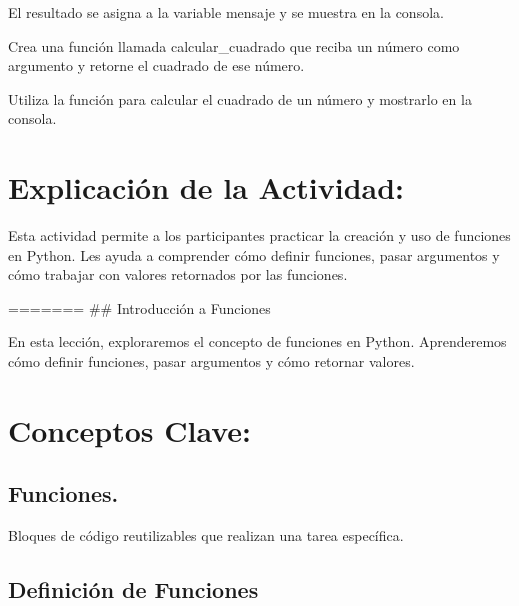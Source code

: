 \documentclass[
  a4paper,
  DIV=11,
  numbers=noendperiod,
  onepage,
  openany]{scrreprt}
\begin{document}
El resultado se asigna a la variable mensaje y se muestra en la consola.

\begin{tcolorbox}[enhanced jigsaw, colbacktitle=quarto-callout-important-color!10!white, toprule=.15mm, leftrule=.75mm, titlerule=0mm, opacityback=0, rightrule=.15mm, opacitybacktitle=0.6, breakable, left=2mm, coltitle=black, title=\textcolor{quarto-callout-important-color}{\faExclamation}\hspace{0.5em}{Actividad Práctica:}, toptitle=1mm, bottomtitle=1mm, arc=.35mm, bottomrule=.15mm, colback=white, colframe=quarto-callout-important-color-frame]

Crea una función llamada calcular\_cuadrado que reciba un número como
argumento y retorne el cuadrado de ese número.

Utiliza la función para calcular el cuadrado de un número y mostrarlo en
la consola.

\end{tcolorbox}

\hypertarget{explicaciuxf3n-de-la-actividad-42}{%
\section{Explicación de la
Actividad:}\label{explicaciuxf3n-de-la-actividad-42}}

Esta actividad permite a los participantes practicar la creación y uso
de funciones en Python. Les ayuda a comprender cómo definir funciones,
pasar argumentos y cómo trabajar con valores retornados por las
funciones.

======= \#\# Introducción a Funciones

En esta lección, exploraremos el concepto de funciones en Python.
Aprenderemos cómo definir funciones, pasar argumentos y cómo retornar
valores.

\hypertarget{conceptos-clave-45}{%
\section{Conceptos Clave:}\label{conceptos-clave-45}}

\hypertarget{funciones.-1}{%
\subsection{Funciones.}\label{funciones.-1}}

Bloques de código reutilizables que realizan una tarea específica.

\hypertarget{definiciuxf3n-de-funciones-1}{%
\subsection{Definición de
Funciones}\label{definiciuxf3n-de-funciones-1}}
\end{document}
